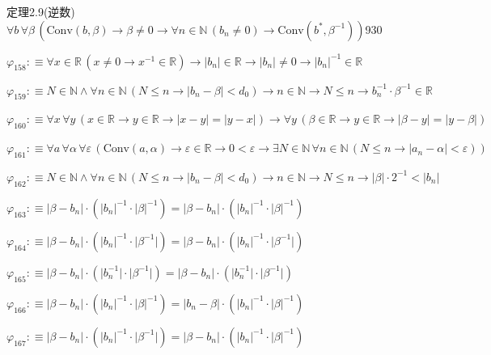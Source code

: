\begin{fullproof}{定理2.9(逆数)}{$\forall b\,\forall \beta\,(\mathrm{Conv}(b,\beta) \to \beta \neq 0 \to \forall n \in \mathbb{N}\,(b_{n} \neq 0) \to \mathrm{Conv}(b^{\ast},\beta^{-1}))$}{930}
\begin{abbrevlist}
\item $\varphi_{158} :\equiv \forall x \in \mathbb{R}\,(x \neq 0 \to x^{-1} \in \mathbb{R}) \to \lvert b_{n} \rvert \in \mathbb{R} \to \lvert b_{n} \rvert \neq 0 \to \lvert b_{n} \rvert^{-1} \in \mathbb{R}$
\item $\varphi_{159} :\equiv N \in \mathbb{N} \land \forall n \in \mathbb{N}\,(N \leq n \to \lvert b_{n} - \beta \rvert < d_{0}) \to n \in \mathbb{N} \to N \leq n \to b_{n}^{-1} \cdot \beta^{-1} \in \mathbb{R}$
\item $\varphi_{160} :\equiv \forall x\,\forall y\,(x \in \mathbb{R} \to y \in \mathbb{R} \to \lvert x - y \rvert = \lvert y - x \rvert) \to \forall y\,(\beta \in \mathbb{R} \to y \in \mathbb{R} \to \lvert \beta - y \rvert = \lvert y - \beta \rvert)$
\item $\varphi_{161} :\equiv \forall a\,\forall \alpha\,\forall \varepsilon\,(\mathrm{Conv}(a,\alpha) \to \varepsilon \in \mathbb{R} \to 0 < \varepsilon \to \exists N \in \mathbb{N}\,\forall n \in \mathbb{N}\,(N \leq n \to \lvert a_{n} - \alpha \rvert < \varepsilon))$
\item $\varphi_{162} :\equiv N \in \mathbb{N} \land \forall n \in \mathbb{N}\,(N \leq n \to \lvert b_{n} - \beta \rvert < d_{0}) \to n \in \mathbb{N} \to N \leq n \to \lvert \beta \rvert \cdot 2^{-1} < \lvert b_{n} \rvert$
\item $\varphi_{163} :\equiv \lvert \beta - b_{n} \rvert \cdot (\lvert b_{n} \rvert^{-1} \cdot \lvert \beta \rvert^{-1}) = \lvert \beta - b_{n} \rvert \cdot (\lvert b_{n} \rvert^{-1} \cdot \lvert \beta \rvert^{-1})$
\item $\varphi_{164} :\equiv \lvert \beta - b_{n} \rvert \cdot (\lvert b_{n} \rvert^{-1} \cdot \lvert \beta^{-1} \rvert) = \lvert \beta - b_{n} \rvert \cdot (\lvert b_{n} \rvert^{-1} \cdot \lvert \beta^{-1} \rvert)$
\item $\varphi_{165} :\equiv \lvert \beta - b_{n} \rvert \cdot (\lvert b_{n}^{-1} \rvert \cdot \lvert \beta^{-1} \rvert) = \lvert \beta - b_{n} \rvert \cdot (\lvert b_{n}^{-1} \rvert \cdot \lvert \beta^{-1} \rvert)$
\item $\varphi_{166} :\equiv \lvert \beta - b_{n} \rvert \cdot (\lvert b_{n} \rvert^{-1} \cdot \lvert \beta \rvert^{-1}) = \lvert b_{n} - \beta \rvert \cdot (\lvert b_{n} \rvert^{-1} \cdot \lvert \beta \rvert^{-1})$
\item $\varphi_{167} :\equiv \lvert \beta - b_{n} \rvert \cdot (\lvert b_{n} \rvert^{-1} \cdot \lvert \beta^{-1} \rvert) = \lvert \beta - b_{n} \rvert \cdot (\lvert b_{n} \rvert^{-1} \cdot \lvert \beta \rvert^{-1})$

\end{abbrevlist}
\end{fullproof}
